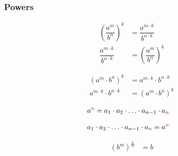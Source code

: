 \documentclass[20150903-160354-rs2.2-MarksMathNotebook.tex]{subfiles}
\begin{document}

\subsubsection{Powers}


\begin{arule}
\begin{subequations}
\begin{align}
	\left(\dfrac{a^m}{b^n}\right)^k &= \dfrac{a^{m \cdot k}}{b^{n\cdot k}} \label{eq:poqpo1}\\
	\dfrac{a^{m \cdot k}}{b^{n\cdot k}} &= \left(\dfrac{a^m}{b^n}\right)^k \label{eq:poqpo2}
\end{align}
\end{subequations}
\end{arule}

\begin{arule}
\begin{subequations}
\begin{align}
	\left(a^m \cdot b^n\right)^k &= a^{m \cdot k} \cdot b^{n\cdot k} \label{eq:poprpo1}\\
	a^{m \cdot k} \cdot b^{n \cdot k} &= \left(a^m \cdot b^n\right)^k \label{eq:poprpo2}
\end{align}
\end{subequations}
\end{arule}

\begin{definition}
\begin{align}
a^{\alert{n}} &= a_1 \cdot a_2 \cdot \ldots \cdot a_{n-1} \cdot a_{\alert{n}} \label{eq:potf}
\end{align}
\end{definition}

\begin{definition}
\begin{align}
a_1 \cdot a_2 \cdot \ldots \cdot a_{n-1} \cdot a_{\alert{n}} &= a^{\alert{n}} \label{eq:ftpo}
\end{align}
\end{definition}

\begin{definition}
\begin{subequations}
\begin{align}
\left(b^{m}\right)^{\frac{1}{m}} &= b  \label{eq:poi}
\end{align}
\end{subequations}
\end{definition}
\end{document}
